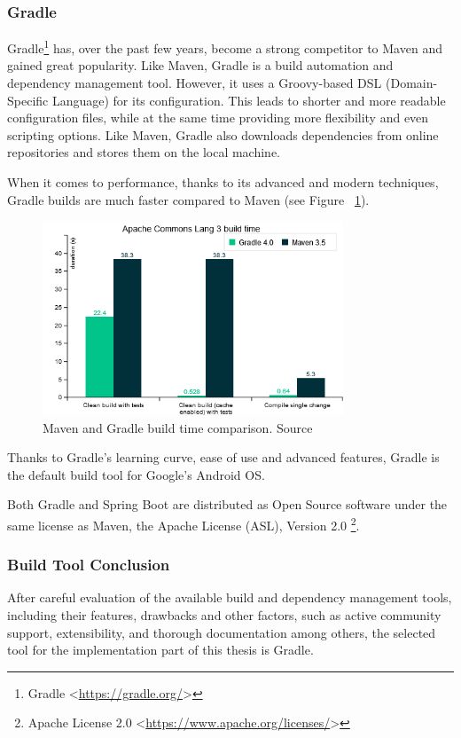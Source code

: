 \subsubsection*{Gradle}
Gradle\footnote{Gradle <\url{https://gradle.org/}>} has, over the past few years, become a strong competitor to Maven and gained great popularity\cite{maven-gradle}. Like Maven, Gradle is a build automation and dependency management tool. However, it uses a Groovy-based DSL (Domain-Specific Language) for its configuration. This leads to shorter and more readable configuration files, while at the same time providing more flexibility and even scripting options. Like Maven, Gradle also downloads dependencies from online repositories and stores them on the local machine.

When it comes to performance, thanks to its advanced and modern techniques, Gradle builds are much faster compared to Maven (see Figure ~\ref{fig:maven-gradle-speed}).

\begin{figure}[!ht]
	\centering
	\includegraphics[width=0.8\textwidth]{figures/02_analysis/maven-gradle-speed}
    \caption{Maven and Gradle build time comparison. Source\cite{maven-vs-gradle}}
    \label{fig:maven-gradle-speed}
\end{figure}

Thanks to Gradle's learning curve, ease of use and advanced features, Gradle is the default build tool for Google's Android OS.

Both Gradle and Spring Boot are distributed as Open Source software under the same license as Maven, the Apache License (ASL), Version 2.0 \footnote{Apache License 2.0 <\url{https://www.apache.org/licenses/}>}.

\subsubsection*{Build Tool Conclusion}
After careful evaluation of the available build and dependency management tools, including their features, drawbacks and other factors, such as active community support, extensibility, and thorough documentation among others, the selected tool for the implementation part of this thesis is Gradle.

